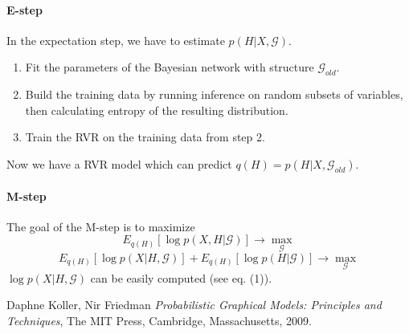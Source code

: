 \documentclass{article}
\newcommand{\graph}[1]{
	\mathcal{#1}
}
\begin{document}
\paragraph{E-step}
In the expectation step, we have to estimate $p(H|X, \graph{G})$. 
\begin{enumerate}
	\item Fit the parameters of the Bayesian network with structure $\graph{G}_{old}$.
	\item Build the training data by running inference on random subsets of variables, then calculating entropy of the resulting distribution.
	\item Train the RVR on the training data from step 2. 
\end{enumerate}
Now we have a RVR model which can predict $q(H) = p(H|X, \graph{G}_{old})$.
\paragraph{M-step}
The goal of the M-step is to maximize
\begin{equation}
E_{q(H)}[\log p(X, H| \graph{G})] \to \max_{\graph{G}}
\end{equation}
\begin{equation}
E_{q(H)}[\log p(X | H, \graph{G})] + E_{q(H)}[\log p(H|\graph{G})] \to \max_{\graph{G}}
\end{equation}
$\log p(X| H, \graph{G})$ can be easily computed (see eq. (1)). 

\begin{thebibliography}{9}
	
	Daphne Koller, Nir Friedman
	\emph{Probabilistic Graphical Models: Principles and Techniques},
	The MIT Press, Cambridge, Massachusetts,
	2009.
	
\end{thebibliography}
\end{document}

